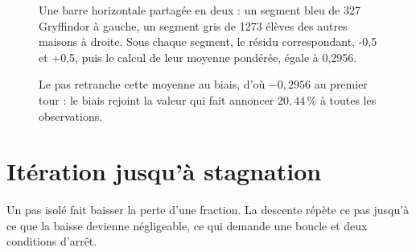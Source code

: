 \begin{figure}[htbp]
\centering
\begin{graphique}{Une barre horizontale partagée en deux : un segment bleu de 327 Gryffindor à gauche, un segment gris de 1273 élèves des autres maisons à droite. Sous chaque segment, le résidu correspondant, -0,5 et +0,5, puis le calcul de leur moyenne pondérée, égale à 0,2956.}
\end{graphique}
\caption{Le pas retranche cette moyenne au biais, d'où $-0{,}2956$ au premier
tour : le biais rejoint la valeur qui fait annoncer $20{,}44\,\%$ à toutes les
observations.}
\label{fig:premierpas}
\end{figure}
\FloatBarrier

\section{Itération jusqu'à stagnation}

Un pas isolé fait baisser la perte d'une fraction. La descente répète ce pas
jusqu'à ce que la baisse devienne négligeable, ce qui demande une boucle et deux
conditions d'arrêt.

